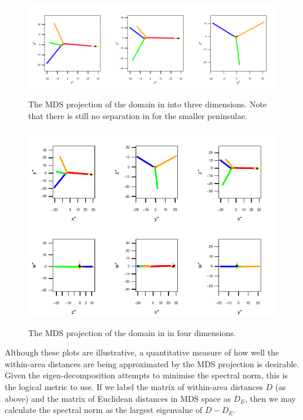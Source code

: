 {\begin{figure}
\centering
\includegraphics[width=6in]{mds/figs/comb-3d.pdf} \\
\caption{The MDS projection of the domain in  into three dimensions. Note that there is still no separation in for the smaller peninsulae.}
\label{mds-comb-3d}
\end{figure}

\begin{figure}
\centering
\includegraphics[width=6in]{mds/figs/comb-4d.pdf} \\
\caption{The MDS projection of the domain in  in four dimensions.}
\label{mds-comb-4d}
\end{figure}

Although these plots are illustrative, a quantitative measure of how well the within-area distances are being approximated by the MDS projection is desirable. Given the eigen-decomposition attempts to minimise the spectral norm, this is the logical metric to use. If we label the matrix of within-area distances $D$ (as above) and the matrix of Euclidean distances in MDS space as $D_E$, then we may calculate the spectral norm as the largest eigenvalue of $D-D_E$.

}
